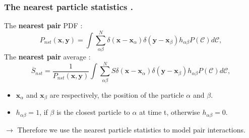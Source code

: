 \documentclass{sintefbeamer}
\newcommand{\nstavg}[1]{\overline{#1}_{nst}}
\begin{document}





\begin{frame}
  \frametitle{The nearest particle statistics \citep{zhang2021ensemble}.}

    The \textbf{nearest pair} PDF :
    \begin{equation*}
      P_{nst}(\textbf{x},\textbf{y}) 
      = \int
      \sum_{\alpha\beta}^N 
      \delta(\textbf{x} - \textbf{x}_\alpha)\delta(\textbf{y} - \textbf{x}_\beta) h_{\alpha\beta} P(\mathscr{C}) d\mathscr{C},
    \end{equation*}
    The \textbf{nearest pair} average :
    \begin{equation*}
      \nstavg{S} 
      = \frac{1}{P_{nst}(\textbf{x},\textbf{y}) }\int
      \sum_{\alpha\beta}^N S
      \delta(\textbf{x} - \textbf{x}_\alpha)\delta(\textbf{y} - \textbf{x}_\beta) h_{\alpha\beta}  P(\mathscr{C}) d\mathscr{C},
    \end{equation*}

    \begin{itemize}
      \item $\textbf{x}_\alpha$ and $\textbf{x}_\beta$ are respectively, the position of the particle $\alpha$ and $\beta$. 
      \item $h_{\alpha\beta}=1$, if $\beta$ is the closest particle to $\alpha$ at time t, otherwise $h_{\alpha\beta} =0$. 
    \end{itemize}

    \vfill
    $\rightarrow$ Therefore we use the nearest particle statistics to model pair interactions. 
\end{frame}
\end{document}
